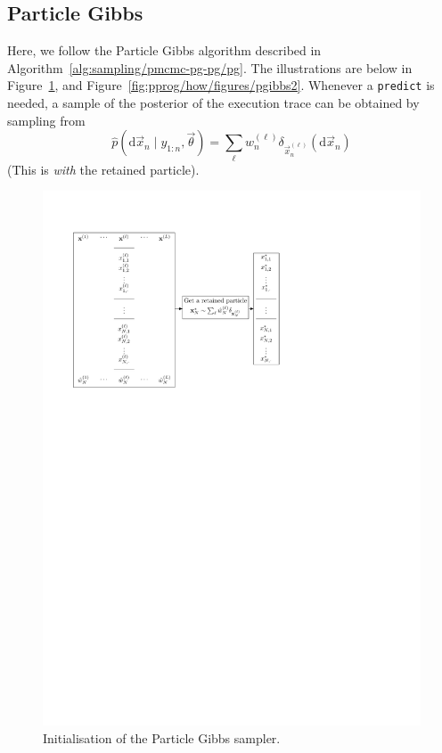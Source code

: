 \subsection{Particle Gibbs}
Here, we follow the Particle Gibbs algorithm described in Algorithm~\ref{alg:sampling/pmcmc-pg-pg/pg}. The illustrations are below in Figure~\ref{fig:pprog/how/figures/pgibbs1}, and Figure~\ref{fig:pprog/how/figures/pgibbs2}. Whenever a \verb!predict! is needed, a sample of the posterior of the execution trace can be obtained by sampling from
\begin{equation*}
	\hat p(\mathrm d \vec x_n \mid y_{1:n}, \vec \theta) = \sum_\ell \hat w_n^{(\ell)} \delta_{\vec x_n^{(\ell)}}(\mathrm d \vec x_{n})
\end{equation*}
(This is \emph{with} the retained particle).

\begin{figure}[!htb]
\centering
\includegraphics[scale=0.75]{pprog/how/figures/pgibbs/pgibbs1}
\caption{Initialisation of the Particle Gibbs sampler.}
\label{fig:pprog/how/figures/pgibbs1}
\end{figure}

